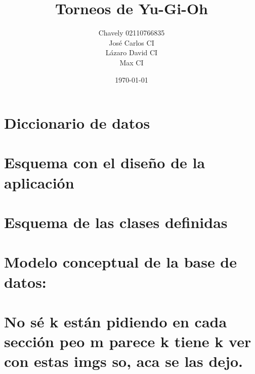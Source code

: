 \documentclass[a4paper]{article}
\begin{document}
\title{Torneos de Yu-Gi-Oh}
\author{
  \begin{tabular}{c}
    Chavely 02110766835 \\
    Jos\'e Carlos CI \\
    L\'azaro David CI \\
    Max CI
  \end{tabular}
}
\date{\today}
\maketitle
\newpage

\section{Diccionario de datos}

\newpage

\section{Esquema con el dise\~no de la aplicaci\'on}

\newpage

\section{Esquema de las clases definidas}

\newpage

\section{Modelo conceptual de la base de datos:}

\newpage

\section{No s\'e k est\'an pidiendo en cada secci\'on peo m parece k tiene k ver con estas imgs so, aca se las dejo.}
\end{document}
